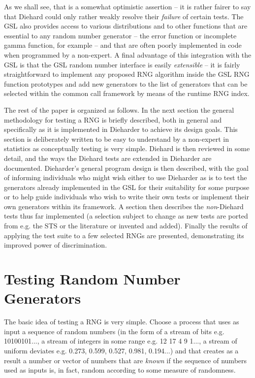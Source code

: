 \documentclass{book}
\begin{document}
As we shall see, that is a somewhat optimistic assertion -- it is rather
fairer to say that Diehard could only rather weakly resolve their {\em
failure} of certain tests.  The GSL also provides access to various
distributions and to other functions that are essential to any random
number generator -- the error function or incomplete gamma function, for
example -- and that are often poorly implemented in code when programmed
by a non-expert.  A final advantage of this integration with the GSL is
that the GSL random number interface is easily {\em extensible} -- it is
fairly straightforward to implement any proposed RNG algorithm inside
the GSL RNG function prototypes and add new generators to the list of
generators that can be selected within the common call framework by
means of the runtime RNG index.

The rest of the paper is organized as follows.  In the next section the
general methodology for testing a RNG is briefly described, both in
general and specifically as it is implemented in Dieharder to achieve
its design goals.  This section is deliberately written to be easy to
understand by a non-expert in statistics as conceptually testing is very
simple.  Diehard is then reviewed in some detail, and the ways the
Diehard tests are extended in Dieharder are documented.  Dieharder's
general program design is then described, with the goal of informing
individuals who might wish either to use Dieharder as is to test the
generators already implemented in the GSL for their suitability for some
purpose or to help guide individuals who wish to write their own tests
or implement their own generators within its framework.  A section then
describes the {\em non}-Diehard tests thus far implemented (a selection
subject to change as new tests are ported from e.g. the STS or the
literature or invented and added).  Finally the results of applying the
test suite to a few selected RNGs are presented, demonstrating its
improved power of discrimination.

\chapter{Testing Random Number Generators}

The basic idea of testing a RNG is very simple.  Choose a process that
uses as input a sequence of random numbers (in the form of a stream of
bits e.g. 10100101..., a stream of integers in some range e.g. 12 17 4 9
1..., a stream of uniform deviates e.g. 0.273, 0.599, 0.527, 0.981,
0.194...) and that creates as a result a number or vector of numbers
that are {\em known} if the sequence of numbers used as inputs is, in
fact, random according to some measure of randomness.
\end{document}
